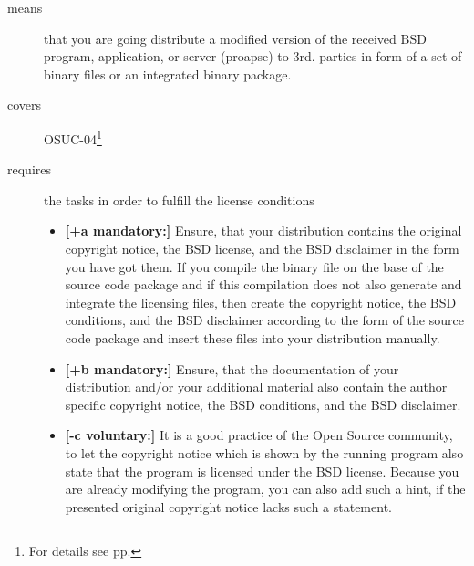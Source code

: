 \begin{description}
\item[means] that you are going distribute a modified version of the received
BSD pro\-gram, application, or server (proapse) to 3rd. parties in form of a set
of binary files or an integrated binary package.
\item[covers] OSUC-04\footnote{For details see pp. \pageref{OSUC-04-DEF}}
\item[requires] the tasks in order to fulfill the license conditions
\begin{itemize}

  \item  \textbf{[+a mandatory:]} Ensure, that your distribution contains the
  original copyright notice, the BSD license, and the BSD disclaimer in the form
  you have got them. If you compile the binary file on the base of the source
  code package and if this compilation does not also generate and integrate the
  licensing files, then create the copyright notice, the BSD conditions, and the
  BSD disclaimer according to the form of the source code package and insert
  these files into your distribution manually.

  \item  \textbf{[+b mandatory:]} Ensure, that the documentation of your
  distribution and/or your additional material also contain the author specific
  copyright notice, the BSD conditions, and the BSD disclaimer.
  
  \item \textbf{[-c voluntary:]} It is a good practice of the Open Source
  community, to let the copyright notice which is shown by the running program
  also state that the program is licensed under the BSD license. Because you are
  already modifying the program, you can also add such a hint, if the presented
  original copyright notice lacks such a statement.
\end{itemize}
\end{description}

